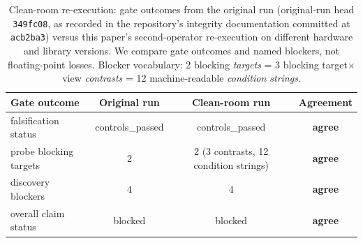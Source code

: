 \begin{table}[t]
  \centering
  \small
  \begin{tabular}{lccc}
    \toprule
    Gate outcome & Original run & Clean-room run & Agreement \\
    \midrule
    falsification status & controls\_passed & controls\_passed & \textbf{agree} \\
    probe blocking targets & 2 & 2 (3 contrasts, 12 condition strings) & \textbf{agree} \\
    discovery blockers & 4 & 4 & \textbf{agree} \\
    overall claim status & blocked & blocked & \textbf{agree} \\
    \bottomrule
  \end{tabular}
  \caption{Clean-room re-execution: gate outcomes from the original run (original-run head \texttt{349fc08}, as recorded in the repository's integrity documentation committed at \texttt{acb2ba3}) versus this paper's second-operator re-execution on different hardware and library versions. We compare gate outcomes and named blockers, not floating-point losses. Blocker vocabulary: 2 blocking \emph{targets} = 3 blocking target$\times$view \emph{contrasts} = 12 machine-readable \emph{condition strings}.}
  \label{tab:cleanroom}
\end{table}
